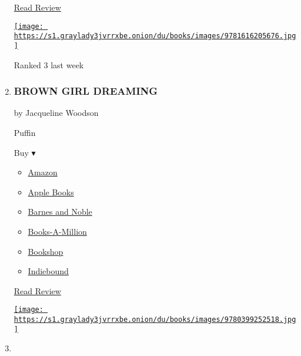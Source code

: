\begin{enumerate}
  \href{https://www.nytimes3xbfgragh.onion/2016/10/09/books/review/girl-who-drank-the-moon-kelly-barnhill.html}{Read
  Review}

  \href{https://www.nytimes3xbfgragh.onion/2016/10/09/books/review/girl-who-drank-the-moon-kelly-barnhill.html}{\texttt{[image: https://s1.graylady3jvrrxbe.onion/du/books/images/9781616205676.jpg]}}

  Ranked 3 last week
\item
  \href{https://www.nytimes3xbfgragh.onion/2014/08/24/books/review/jacqueline-woodsons-brown-girl-dreaming.html}{}

  \hypertarget{brown-girl-dreaming}{%
  \subsubsection{BROWN GIRL DREAMING}\label{brown-girl-dreaming}}

  by Jacqueline Woodson

  Puffin

  Buy ▾

  \begin{itemize}
  \tightlist
  \item
    \href{http://www.amazon.com/Brown-Girl-Dreaming-Jacqueline-Woodson/dp/0399252517?tag=NYTBS-20}{Amazon}
  \item
    \href{https://du-gae-books-dot-nyt-du-prd.appspot.com/buy?title=BROWN+GIRL+DREAMING\&author=Jacqueline+Woodson}{Apple
    Books}
  \item
    \href{https://www.anrdoezrs.net/click-7990613-11819508?url=https\%3A\%2F\%2Fwww.barnesandnoble.com\%2Fw\%2F\%3Fean\%3D9780147515827}{Barnes
    and Noble}
  \item
    \href{https://www.anrdoezrs.net/click-7990613-35140?url=https\%3A\%2F\%2Fwww.booksamillion.com\%2Fp\%2FBROWN\%2BGIRL\%2BDREAMING\%2FJacqueline\%2BWoodson\%2F9780147515827}{Books-A-Million}
  \item
    \href{https://bookshop.org/a/3546/9780147515827}{Bookshop}
  \item
    \href{https://www.indiebound.org/book/9780147515827?aff=NYT}{Indiebound}
  \end{itemize}

  \href{https://www.nytimes3xbfgragh.onion/2014/08/24/books/review/jacqueline-woodsons-brown-girl-dreaming.html}{Read
  Review}

  \href{https://www.nytimes3xbfgragh.onion/2014/08/24/books/review/jacqueline-woodsons-brown-girl-dreaming.html}{\texttt{[image: https://s1.graylady3jvrrxbe.onion/du/books/images/9780399252518.jpg]}}
\item
  \hypertarget{a-long-walk-to-water}{%
}
\end{enumerate}
